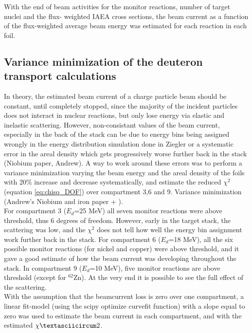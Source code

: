 With the end of beam activities for the monitor reactions, number of target nuclei and the flux- weighted IAEA cross sections, the beam current as a function of the flux-weighted average beam energy was estimated for each reaction in each foil. 

\subsection{Variance minimization of the deuteron transport calculations}
In theory, the estimated beam current of a charge particle beam should be constant, until completely stopped, since the majority of the incident particles does not interact in nuclear reactions, but only lose energy via elastic and inelastic scattering. However, non-consistant values of the beam current, especially in the back of the stack can be due to energy bins being assigned wrongly in the energy distribution simulation done in Ziegler or a systematic error in the areal density which gets progressively worse further back in the stack (Niobium paper, Andrew). A way to work around these errors was to perform a variance minimization varying the beam energy and the areal density of the foils with 20\% increase and decrease systematically, and estimate the reduced $\chi^2$ (equation \ref{eq:chisq_DOF}) over compartment 3,6 and 9. Variance minimization (Andrew's Niobium and iron paper + ). \\

 For compartment 3 ($E_d$=25 MeV) all seven monitor reactions were above threshold,  thus 6 degrees of freedom.  However,  early in the target stack,  the scattering was low, and the $\chi^2$ does not tell how well the energy bin assignment work further back in the stack.  For compartment 6 ($E_d$=18 MeV), all the six possible monitor reactions (for nickel and copper) were above threshold, and it gave a good estimate of how the beam current was developing throughout the stack.  In compartment 9 ($E_d$=10 MeV), five monitor reactions are above threshold (except for $^{62}$Zn).  At the very end it is possible to see the full effect of the scattering.\\

With the assumption that the beamcurrent loss is zero over one compartment, a linear fit-model (using the scipy optimize curvefit function) with a slope equal to zero was used to estimate the beam current in each compartment, and with the estimated $\chiˆ2$.  

